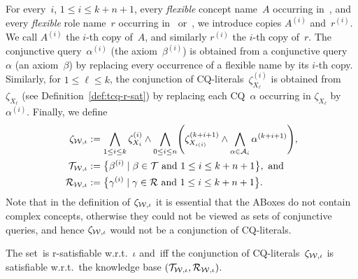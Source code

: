 For every~$i$, $1\le i\le k+n+1$, every \emph{flexible} concept name~$A$
occurring in~\Tmc, and every \emph{flexible} role name~$r$ occurring in~\Tmc
or~\Rmc, we introduce copies $A^{(i)}$ and~$r^{(i)}$.  We call $A^{(i)}$ the
$i$-th copy of~$A$, and similarly $r^{(i)}$ the $i$-th copy of~$r$.  The
conjunctive query~$\alpha^{(i)}$ (the axiom~$\beta^{(i)}$) is obtained from a
conjunctive query~$\alpha$ (an axiom~$\beta$) by replacing every occurrence of a
flexible name by its $i$-th copy.  Similarly, for $1\le\ell\le k$, the
conjunction of CQ-literals~$\zeta_{X_\ell}^{(i)}$ is obtained
from~$\zeta_{X_\ell}$ (see Definition~\ref{def:tcq-r-sat}) by replacing each
CQ~$\alpha$ occurring in $\zeta_{X_\ell}$ by~$\alpha^{(i)}$.
%
Finally, we define
\begin{align*}
    \zeta_{\Wmc,\iota}
    &:=\bigwedge_{1\le i\le k}\zeta_{X_i}^{(i)}\land%
        \bigwedge_{0\le i\le n}\Biggl(\zeta_{X_{\iota(i)}}^{(k+i+1)}\land
        \bigwedge_{\alpha\in\Amc_i}\alpha^{(k+i+1)}\Biggr),\\
    \Tmc_{\Wmc,\iota}
    &:=\bigl\{\beta^{(i)}\mid\beta\in\Tmc\ \text{and}\ 1\le i\le k+n+1\bigr\},\ \text{and}\\
    \Rmc_{\Wmc,\iota}
    &:=\bigl\{\gamma^{(i)}\mid\gamma\in\Rmc\ \text{and}\ 1\le i\le k+n+1\bigr\}.
\end{align*}
%
Note that in the definition of $\zeta_{\mathcal{W},\iota}$ it is essential that the
ABoxes do not contain complex concepts, otherwise they could not be viewed as
sets of conjunctive queries, and hence $\zeta_{\mathcal{W},\iota}$ would not be a
conjunction of CQ-literals.

\begin{lemma}\label{lem:zeta-wmc-iota}
    The set~\Wmc is r-satisfiable w.r.t.~$\iota$ and~\Kmc iff the conjunction of
    CQ-literals~$\zeta_{\mathcal{W},\iota}$ is satisfiable w.r.t.\ the knowledge base
    $(\mathcal{T}_{\mathcal{W},\iota},\mathcal{R}_{\mathcal{W},\iota})$.
\end{lemma}

